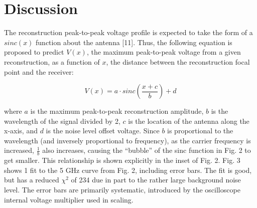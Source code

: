 \section{Discussion}
\label{sec:spatial-profile-discussion}

The reconstruction peak-to-peak voltage profile is expected to take the form of a $sinc(x)$ function about the antenna [11]. Thus, the following equation is proposed to predict $V(x)$, the maximum peak-to-peak voltage from a given reconstruction, as a function of $x$, the distance between the reconstruction focal point and the receiver:

$$V(x) = a\cdot sinc\left(\frac{x+c}{b}\right) + d$$

where $a$ is the maximum peak-to-peak reconstruction amplitude, $b$ is the wavelength of the signal divided by 2, $c$ is the location of the antenna along the x-axis, and $d$ is the noise level
offset voltage. Since $b$ is proportional to the wavelength (and inversely proportional
to frequency), as the carrier frequency is increased,  $\frac{1}{b}$ also increases, causing the “bubble” of the sinc function in Fig. 2 to get smaller. This relationship is shown explicitly in the inset of Fig. 2. Fig. 3 shows 1 fit to the 5 GHz curve from Fig. 2, including error bars. The fit is good, but has a reduced $\chi^2$ of 234 due in part to the rather large background noise level. The error bars are primarily systematic, introduced by the oscilloscope internal voltage multiplier used in scaling.
